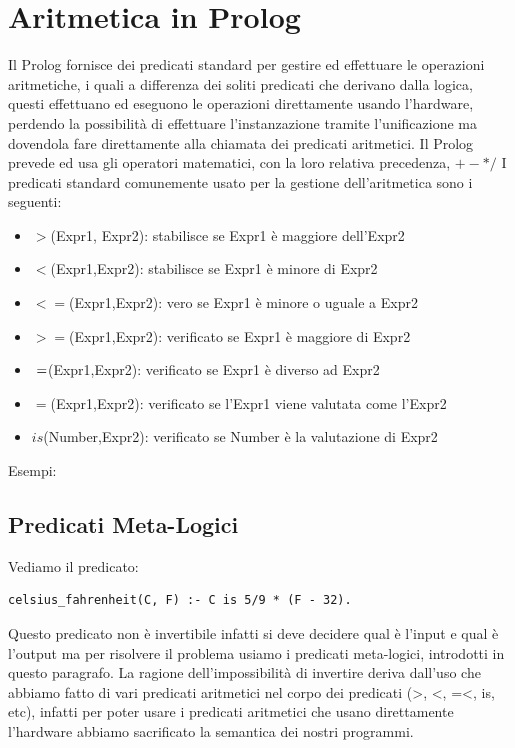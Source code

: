 \documentclass[a4paper]{report}
\begin{document}
\section{Aritmetica in Prolog}
Il Prolog fornisce dei predicati standard per gestire ed effettuare le operazioni aritmetiche, i quali a differenza dei soliti predicati
che derivano dalla logica, questi effettuano ed eseguono le operazioni direttamente usando l’hardware, perdendo la possibilità di effettuare
l’instanzazione tramite l’unificazione ma dovendola fare direttamente alla chiamata dei predicati aritmetici.
Il Prolog prevede ed usa gli operatori matematici, con la loro relativa precedenza, $+ - * /$ 
I predicati standard comunemente usato per la gestione dell’aritmetica sono i seguenti:
\begin{itemize}
    \item $>$(Expr1, Expr2): stabilisce se Expr1 è maggiore dell’Expr2
    \item $<$(Expr1,Expr2): stabilisce se Expr1 è minore di Expr2
    \item $<=$(Expr1,Expr2): vero se Expr1 è minore o uguale a Expr2
    \item $>=$(Expr1,Expr2): verificato se Expr1 è maggiore di Expr2
    \item $\\=$(Expr1,Expr2): verificato se Expr1 è diverso ad Expr2
    \item $=$(Expr1,Expr2): verificato se l’Expr1 viene valutata come l’Expr2
    \item $is$(Number,Expr2): verificato se Number è la valutazione di Expr2
\end{itemize}
Esempi:

\subsection{Predicati Meta-Logici}
Vediamo il predicato:
\begin{verbatim}
celsius_fahrenheit(C, F) :- C is 5/9 * (F - 32).
\end{verbatim}
Questo predicato non è invertibile infatti si deve decidere qual è l'input e qual è l'output ma per risolvere il problema usiamo
i predicati meta-logici, introdotti in questo paragrafo.\newline
La ragione dell'impossibilità di invertire deriva dall'uso che abbiamo fatto di vari predicati aritmetici nel corpo dei predicati
(>, <, =<, is, etc), infatti per poter usare i predicati aritmetici che usano direttamente l'hardware
abbiamo sacrificato la semantica dei nostri programmi.
\end{document}
